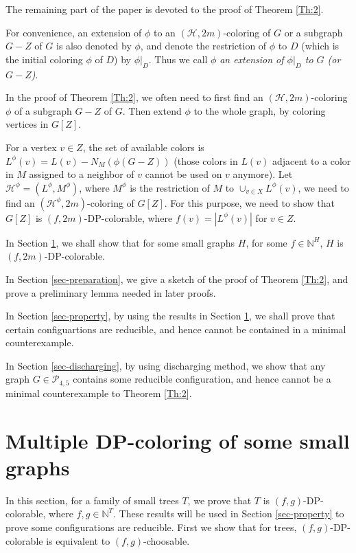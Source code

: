 \documentclass{article}
\begin{document}
\bigskip 
 The remaining part of the paper is devoted to the proof of Theorem \ref{Th:2}.  
 
 
For convenience, an extension of $\phi$ to an  $(\mathcal{H}, 2m)$-coloring of $G$ or a subgraph $G-Z$ of $G$ is also denoted by $\phi$, and denote the restriction of $\phi$ to $D$ (which is the initial coloring $\phi$ of $D$) by $\phi|_D$. Thus we call $\phi$   \textit{an extension of $\phi|_D$ to $G$ (or $G-Z$)}.  

 In the proof of Theorem \ref{Th:2}, we often need to first find an $(\mathcal{H},2m)$-coloring $\phi$ of a subgraph $G-Z$ of $G$. Then extend $\phi$ to the whole graph, by coloring vertices in $G[Z]$. 
 
 For a vertex $v \in Z$, the set of available colors is  $L^{\phi}(v) = L(v) - N_M(\phi(G-Z))$ (those colors in $L(v)$ adjacent to a color in $M$ assigned to a neighbor of $v$ cannot be used on $v$ anymore). Let $\mathcal{H}^{\phi} = (L^{\phi}, M^{\phi})$, where $M^{\phi}$ is the restriction of $M$ to $\cup_{v \in X} L^{\phi}(v)$,  we need to find an $(\mathcal{H}^{\phi}, 2m)$-coloring of $G[Z]$. For this purpose, we need to show that 
 $G[Z]$ is $(f,2m)$-DP-colorable, where $f(v) = |L^{\phi}(v)|$ for $v \in Z$. 

 In Section \ref{sec-f2m}, we shall show that for some small graphs $H$, for some $f \in \mathbb{N}^H$, $H$ is $(f,2m)$-DP-colorable.

 In Section \ref{sec-preparation}, we give a sketch of the proof of Theorem \ref{Th:2}, and prove a preliminary lemma needed in later proofs.

In Section \ref{sec-property}, by using the results in Section \ref{sec-f2m},  we shall prove that certain configuartions are reducible, and hence cannot be contained in a minimal counterexample.     

In Section \ref{sec-discharging}, by using discharging method, we show that any graph $G \in \mathcal{P}_{4,5}$ contains some reducible configuration, and hence cannot be a minimal counterexample to Theorem \ref{Th:2}. 

\section{Multiple DP-coloring of some small graphs}
\label{sec-f2m}

In this section, for a family of small trees $T$, we prove that $T$ is $(f, g)$-DP-colorable, where $f,g \in \mathbb{N}^T$. These results will be used in Section \ref{sec-property} to prove some configurations are reducible.
First we show that for trees, $(f,g)$-DP-colorable is equivalent to $(f,g)$-choosable.
\end{document}
